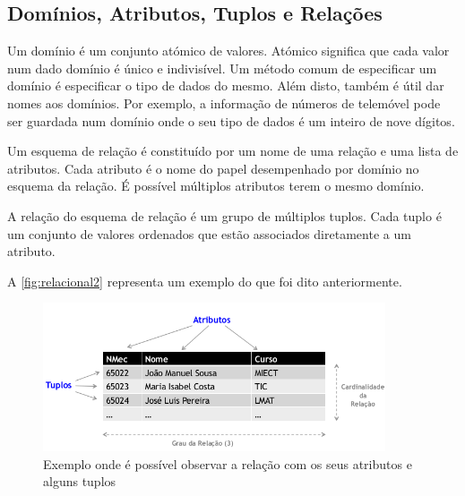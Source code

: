 \documentclass[11pt,twoside,a4paper]{report}
\begin{document}
\subsection{Domínios, Atributos, Tuplos e Relações}
Um domínio é um conjunto atómico de valores. Atómico significa que cada valor num dado domínio é único e indivisível. Um método comum de especificar um domínio é especificar o tipo de dados do mesmo. Além disto, também é útil dar nomes aos domínios. Por exemplo, a informação de números de telemóvel pode ser guardada num domínio onde o seu tipo de dados é um inteiro de nove dígitos\cite{Elmasri:2010:FDS:1855347}.\par
Um esquema de relação é constituído por um nome de uma relação e uma lista de atributos. Cada atributo é o nome do papel desempenhado por domínio no esquema da relação. É possível múltiplos atributos terem o mesmo domínio\cite{Elmasri:2010:FDS:1855347}.\par 
A relação do esquema de relação é um grupo de múltiplos tuplos. Cada tuplo é um conjunto de valores ordenados que estão associados diretamente a um atributo.\par 
A \autoref{fig:relacional2} representa um exemplo do que foi dito anteriormente.
\begin{figure}[H]
	\begin{center}
		\includegraphics[width=0.9\textwidth]{exemplo_relacional} %
		\caption{Exemplo onde é possível observar a relação com os seus atributos e alguns tuplos}
		\label{fig:relacional2}
	\end{center}
\end{figure}
\end{document}
